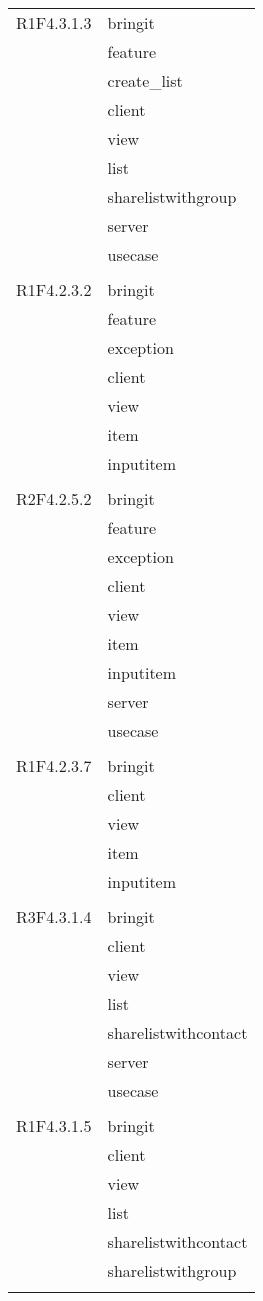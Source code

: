 \begin{center}
\begin{longtable}{|p{7cm}|p{7cm}|}
		R1F4.3.1.3 & bringit \\ & feature \\ & create\_list \\ & client \\ & view \\ & list \\ & sharelistwithgroup \\ & server \\ & usecase \\ & \\ \hline
		R1F4.2.3.2 & bringit \\ & feature \\ & exception \\ & client \\ & view \\ & item \\ & inputitem \\ & \\ \hline
		R2F4.2.5.2 & bringit \\ & feature \\ & exception \\ & client \\ & view \\ & item \\ & inputitem \\ & server \\ & usecase \\ & \\ \hline
		R1F4.2.3.7 & bringit \\ & client \\ & view \\ & item \\ & inputitem \\ & \\ \hline
		R3F4.3.1.4 & bringit \\ & client \\ & view \\ & list \\ & sharelistwithcontact \\ & server \\ & usecase \\ & \\ \hline
		R1F4.3.1.5 & bringit \\ & client \\ & view \\ & list \\ & sharelistwithcontact \\ & sharelistwithgroup \\ & \\ \hline

\end{longtable}
\end{center}
